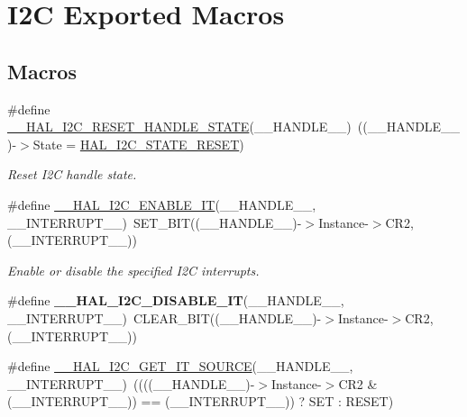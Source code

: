 \hypertarget{group___i2_c___exported___macros}{}\section{I2C Exported Macros}
\label{group___i2_c___exported___macros}
\subsection*{Macros}
\begin{DoxyCompactItemize}
\item 
\#define \hyperlink{group___i2_c___exported___macros_ga74c8fd72a78882720c28448ce8bd33d8}{\+\_\+\+\_\+\+H\+A\+L\+\_\+\+I2\+C\+\_\+\+R\+E\+S\+E\+T\+\_\+\+H\+A\+N\+D\+L\+E\+\_\+\+S\+T\+A\+TE}(\+\_\+\+\_\+\+H\+A\+N\+D\+L\+E\+\_\+\+\_\+)~((\+\_\+\+\_\+\+H\+A\+N\+D\+L\+E\+\_\+\+\_\+)-\/$>$State = \hyperlink{group___h_a_l__state__structure__definition_ggaef355af8eab251ae2a19ee164ad81c37a91ba08634e08d7287940f1bc5a37eeff}{H\+A\+L\+\_\+\+I2\+C\+\_\+\+S\+T\+A\+T\+E\+\_\+\+R\+E\+S\+ET})
\begin{DoxyCompactList}\small\item\em Reset I2C handle state. \end{DoxyCompactList}\item 
\#define \hyperlink{group___i2_c___exported___macros_gac9d8b249b06b2d30f987acc9ceebd1d9}{\+\_\+\+\_\+\+H\+A\+L\+\_\+\+I2\+C\+\_\+\+E\+N\+A\+B\+L\+E\+\_\+\+IT}(\+\_\+\+\_\+\+H\+A\+N\+D\+L\+E\+\_\+\+\_\+,  \+\_\+\+\_\+\+I\+N\+T\+E\+R\+R\+U\+P\+T\+\_\+\+\_\+)~S\+E\+T\+\_\+\+B\+IT((\+\_\+\+\_\+\+H\+A\+N\+D\+L\+E\+\_\+\+\_\+)-\/$>$Instance-\/$>$C\+R2,(\+\_\+\+\_\+\+I\+N\+T\+E\+R\+R\+U\+P\+T\+\_\+\+\_\+))
\begin{DoxyCompactList}\small\item\em Enable or disable the specified I2C interrupts. \end{DoxyCompactList}\item 
\mbox{\label{group___i2_c___exported___macros_ga33d0c7202ae298fa3ae128c5da49d455}} 
\#define {\bfseries \+\_\+\+\_\+\+H\+A\+L\+\_\+\+I2\+C\+\_\+\+D\+I\+S\+A\+B\+L\+E\+\_\+\+IT}(\+\_\+\+\_\+\+H\+A\+N\+D\+L\+E\+\_\+\+\_\+,  \+\_\+\+\_\+\+I\+N\+T\+E\+R\+R\+U\+P\+T\+\_\+\+\_\+)~C\+L\+E\+A\+R\+\_\+\+B\+IT((\+\_\+\+\_\+\+H\+A\+N\+D\+L\+E\+\_\+\+\_\+)-\/$>$Instance-\/$>$C\+R2, (\+\_\+\+\_\+\+I\+N\+T\+E\+R\+R\+U\+P\+T\+\_\+\+\_\+))
\item 
\#define \hyperlink{group___i2_c___exported___macros_ga932024bf4a259e0cdaf9e50b38e3d41a}{\+\_\+\+\_\+\+H\+A\+L\+\_\+\+I2\+C\+\_\+\+G\+E\+T\+\_\+\+I\+T\+\_\+\+S\+O\+U\+R\+CE}(\+\_\+\+\_\+\+H\+A\+N\+D\+L\+E\+\_\+\+\_\+,  \+\_\+\+\_\+\+I\+N\+T\+E\+R\+R\+U\+P\+T\+\_\+\+\_\+)~((((\+\_\+\+\_\+\+H\+A\+N\+D\+L\+E\+\_\+\+\_\+)-\/$>$Instance-\/$>$C\+R2 \& (\+\_\+\+\_\+\+I\+N\+T\+E\+R\+R\+U\+P\+T\+\_\+\+\_\+)) == (\+\_\+\+\_\+\+I\+N\+T\+E\+R\+R\+U\+P\+T\+\_\+\+\_\+)) ? S\+ET \+: R\+E\+S\+ET)

\end{DoxyCompactItemize}
